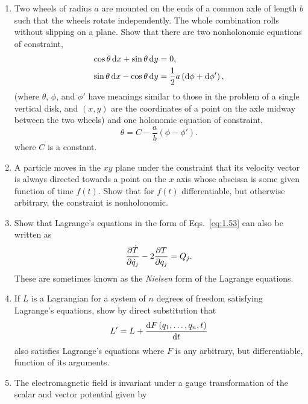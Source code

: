 \begin{enumerate}
    \item Two wheels of radius \(a\) are mounted on the ends of a common axle of length \(b\) such that the wheels rotate independently. The whole combination rolls without slipping on a plane. Show that there are two nonholonomic equations of constraint,
    \begin{equation*}
        \begin{aligned}
            \cos\theta\odif{x}+\sin\theta\odif{y}&=0,\\
            \sin\theta\odif{x}-\cos\theta\odif{y}&=\frac{1}{2}a\left(\odif{\phi}+\odif{\phi'}\right),
        \end{aligned}
    \end{equation*}
    (where \(\theta\), \(\phi\), and \(\phi'\) have meanings similar to those in the problem of a single vertical disk, and \(\left(x,y\right)\) are the coordinates of a point on the axle midway between the two wheels) and one holonomic equation of constraint,
    \begin{equation*}
        \theta=C-\frac{a}{b}\left(\phi-\phi'\right).
    \end{equation*}
    where \(C\) is a constant.
    \item A particle moves in the \(xy\) plane under the constraint that its velocity vector is always directed towards a point on the \(x\) axis whose abscissa is some given function of time \(f\left(t\right)\). Show that for \(f\left(t\right)\) differentiable, but otherwise arbitrary, the constraint is nonholonomic.
    \item Show that Lagrange's equations in the form of Eqs.~\eqref{eq:1.53} can also be written as
    \begin{equation*}
        \pdv{\dot{T}}{\dot{q}_j}-2\pdv{T}{q_j}=Q_j.
    \end{equation*}
    These are sometimes known as the \emph{Nielsen} form of the Lagrange equations.
    \item If \(L\) is a Lagrangian for a system of \(n\) degrees of freedom satisfying Lagrange's equations, show by direct substitution that
    \begin{equation*}
        L'=L+\odv{F\left(q_1,\ldots,q_n,t\right)}{t}
    \end{equation*}
    also satisfies Lagrange's equations where \(F\) is any arbitrary, but differentiable, function of its arguments.
    \item The electromagnetic field is invariant under a gauge transformation of the scalar and vector potential given by

\end{enumerate}
